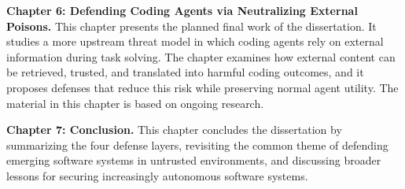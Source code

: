 \noindent \textbf{Chapter 6: Defending Coding Agents via Neutralizing External Poisons.}
This chapter presents the planned final work of the dissertation.
It studies a more upstream threat model in which coding agents rely on external information
during task solving.
The chapter examines how external content can be retrieved, trusted,
and translated into harmful coding outcomes, and it proposes defenses that reduce this risk
while preserving normal agent utility. 
The material in this chapter is based on ongoing research.

\noindent \textbf{Chapter 7: Conclusion.}
This chapter concludes the dissertation by summarizing the four defense layers,
revisiting the common theme of defending emerging software systems in untrusted environments,
and discussing broader lessons for securing increasingly autonomous software systems.
